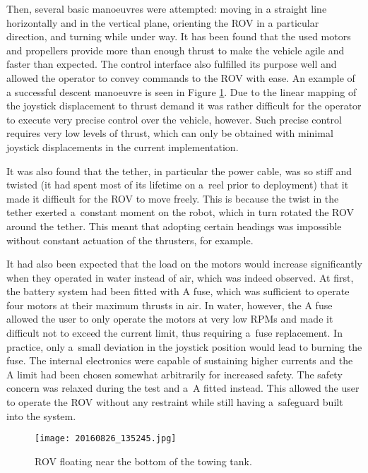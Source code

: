 Then, several basic manoeuvres were attempted:
moving in a straight line horizontally and in the vertical plane, orienting the
ROV in a particular direction, and turning while under way.
It has been found that the used motors and propellers provide more than enough
thrust to make the vehicle agile and faster than expected. The control interface
also fulfilled its purpose well and allowed the operator to convey commands to
the ROV with ease. An example of a successful descent manoeuvre is seen in
Figure \ref{fig:rovThroughTheWindow}.
Due to the linear mapping of the joystick displacement to
thrust demand it was rather difficult for the operator to execute very precise
control over the vehicle, however. Such precise control requires very low levels
of thrust, which can only be obtained with minimal joystick displacements in the
current implementation.

It was also found that the tether, in particular the power cable, was so
stiff and twisted (it had spent most of its lifetime on a~reel prior to deployment)
that it made it difficult for the ROV to move freely. This is because the
twist in the tether exerted a~constant moment on the robot, which in turn
rotated the ROV around the tether. This meant that adopting
certain headings was impossible without constant actuation of the thrusters, for example.

It had also been expected that the load on the motors would increase significantly
when they operated in water instead of air, which was indeed observed. At first,
the battery system had been fitted with \unit[1]{A} fuse, which was sufficient
to operate four motors at their maximum thrusts in air. In water, however, 
the \unit[1]{A} fuse allowed the user to only operate the motors at very low RPMs
and made it difficult not to exceed the current limit, thus requiring a~fuse
replacement. In practice, only a~small deviation in the joystick position would
lead to burning the fuse. The internal electronics were capable of
sustaining higher currents and the \unit[1]{A} limit had been chosen somewhat
arbitrarily for increased safety. The safety concern was relaxed during the test
and a~\unit[4]{A} fitted instead. This allowed the user to operate the ROV 
without any restraint while still having a~safeguard built into the system.

\begin{figure}[htb]
\begin{center}
\texttt{[image: 20160826\_135245.jpg]}
\end{center}
\caption{ROV floating near the bottom of the towing tank.}
\label{fig:rovThroughTheWindow}
\end{figure}

